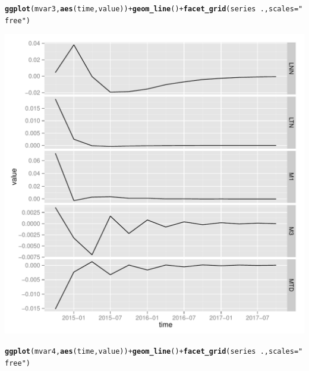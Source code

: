 \documentclass[11pt,oneside, a4paper]{amsart}\usepackage[]{graphicx}\usepackage[]{color}
\makeatletter
\def\maxwidth{ %
  \ifdim\Gin@nat@width>\linewidth
    \linewidth
  \else
    \Gin@nat@width
  \fi
}
\newcommand{\hlstr}[1]{\textcolor[rgb]{0.192,0.494,0.8}{#1}}%
\newcommand{\hlopt}[1]{\textcolor[rgb]{0,0,0}{#1}}%
\newcommand{\hlstd}[1]{\textcolor[rgb]{0.345,0.345,0.345}{#1}}%
\newcommand{\hlkwc}[1]{\textcolor[rgb]{0.333,0.667,0.333}{#1}}%
\newcommand{\hlkwd}[1]{\textcolor[rgb]{0.737,0.353,0.396}{\textbf{#1}}}%
\newenvironment{kframe}{%
 \def\at@end@of@kframe{}%
 \ifinner\ifhmode%
  \def\at@end@of@kframe{\end{minipage}}%
  \begin{minipage}{\columnwidth}%
 \fi\fi%
 \def\FrameCommand##1{\hskip\@totalleftmargin \hskip-\fboxsep
 \colorbox{shadecolor}{##1}\hskip-\fboxsep
     \hskip-\linewidth \hskip-\@totalleftmargin \hskip\columnwidth}%
 \MakeFramed {\advance\hsize-\width
   \@totalleftmargin\z@ \linewidth\hsize
   \@setminipage}}%
 {\par\unskip\endMakeFramed%
 \at@end@of@kframe}
\newenvironment{knitrout}{}{} %
\makeatother
\begin{document}
\begin{knitrout}
\begin{kframe}\begin{alltt}
\hlkwd{ggplot}\hlstd{(mvar3,} \hlkwd{aes}\hlstd{(time,value))} \hlopt{+} \hlkwd{geom_line}\hlstd{()} \hlopt{+} \hlkwd{facet_grid}\hlstd{(series} \hlopt{~} \hlstd{. ,}\hlkwc{scales}\hlstd{=}\hlstr{"free"}\hlstd{)}
\end{alltt}
\end{kframe}
\includegraphics[width=\maxwidth]{figure/unnamed-chunk-5-3} 
\begin{kframe}\begin{alltt}
\hlkwd{ggplot}\hlstd{(mvar4,} \hlkwd{aes}\hlstd{(time,value))} \hlopt{+} \hlkwd{geom_line}\hlstd{()} \hlopt{+} \hlkwd{facet_grid}\hlstd{(series} \hlopt{~} \hlstd{. ,}\hlkwc{scales}\hlstd{=}\hlstr{"free"}\hlstd{)}
\end{alltt}
\end{kframe}

\end{knitrout}
\end{document}
